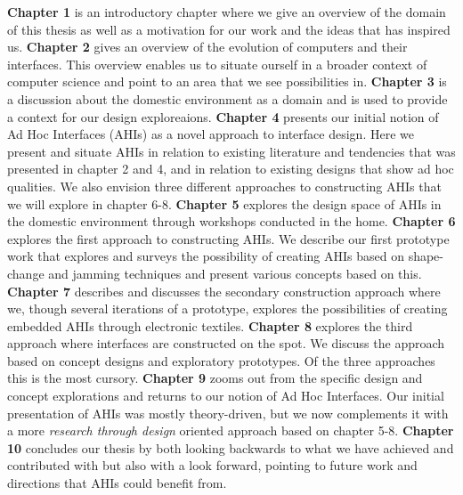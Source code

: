 \textbf{Chapter 1} is an introductory chapter where we give an overview of the domain of this thesis as well as a motivation for our work and the ideas that has inspired us.
\blank
\textbf{Chapter 2} gives an overview of the evolution of computers and their interfaces.
This overview enables us to situate ourself in a broader context of computer science and point to an area that we see possibilities in.  
\blank
\textbf{Chapter 3} is a discussion about the domestic environment as a domain and is used to provide a context for our design exploreaions. 
\blank
\textbf{Chapter 4} presents our initial notion of Ad Hoc Interfaces (AHIs) as a novel approach to interface design.
Here we present and situate AHIs in relation to existing literature and tendencies that was presented in chapter 2 and 4, and in relation to existing designs that show ad hoc qualities.
We also envision three different approaches to constructing AHIs that we will explore in chapter 6-8.
\blank
\textbf{Chapter 5} explores the design space of AHIs in the domestic environment through workshops conducted in the home.
\blank
\textbf{Chapter 6} explores the first approach to constructing AHIs. 
We describe our first prototype work that explores and surveys the possibility of creating AHIs based on shape-change and jamming techniques and present various concepts based on this.
\blank
\textbf{Chapter 7} describes and discusses the secondary construction approach where we, though several iterations of a prototype, explores the possibilities of creating embedded AHIs through electronic textiles.
\blank
\textbf{Chapter 8} explores the third approach where interfaces are constructed on the spot.
We discuss the approach based on concept designs and exploratory prototypes. 
Of the three approaches this is the most cursory.
\blank
\textbf{Chapter 9} zooms out from the specific design and concept explorations and returns to our notion of Ad Hoc Interfaces.
Our initial presentation of AHIs was mostly theory-driven, but we now complements it with a more \emph{research through design} oriented approach based on chapter 5-8. 
\blank
\textbf{Chapter 10} concludes our thesis by both looking backwards to what we have achieved and contributed with but also with a look forward, pointing to future work and directions that AHIs could benefit from.